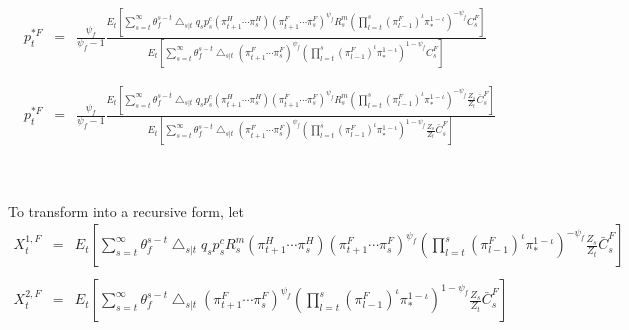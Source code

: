 \documentclass[11pt, a4paper]{article}
\begin{document}
\begin{eqnarray*}
 {p_{t}^{*F}} &=& \frac{\psi_f}{\psi_f-1} \frac{ E_t \left[  \sum_{s=t}^{\infty}  \theta_f^{s-t}  \bigtriangleup_{s|t} q_s {p_s^c} (\pi_{t+1}^H \cdots \pi_{s}^H ) (\pi_{t+1}^F \cdots \pi_s^F)^{\psi_f} R_s^m \left(  {\prod_{l=t}^s {(\pi_{l-1}^F)}^\iota \pi_*^{1-\iota} } \right)^{-\psi_f} C_s^F\right]} {  E_t \left[  \sum_{s=t}^{\infty}  \theta_f^{s-t}  \bigtriangleup_{s|t} (\pi_{t+1}^F \cdots \pi_s^F)^{\psi_f} \left(  {\prod_{l=t}^s {(\pi_{l-1}^F)}^\iota \pi_*^{1-\iota} } \right)^{1-\psi_f} C_s^F \right]} 
  \\~\\~\\ 
 {p_{t}^{*F}} &=& \frac{\psi_f}{\psi_f-1} \frac{ E_t \left[  \sum_{s=t}^{\infty}  \theta_f^{s-t}  \bigtriangleup_{s|t} q_s {p_s^c} (\pi_{t+1}^H \cdots \pi_{s}^H ) (\pi_{t+1}^F \cdots \pi_s^F)^{\psi_f} R_s^m \left(  {\prod_{l=t}^s {(\pi_{l-1}^F)}^\iota \pi_*^{1-\iota} } \right)^{-\psi_f} \frac{Z_s}{Z_t}\bar{C}_s^F\right]} {  E_t \left[  \sum_{s=t}^{\infty}  \theta_f^{s-t}  \bigtriangleup_{s|t} (\pi_{t+1}^F \cdots \pi_s^F)^{\psi_f} \left(  {\prod_{l=t}^s {(\pi_{l-1}^F)}^\iota \pi_*^{1-\iota} } \right)^{1-\psi_f} \frac{Z_s}{Z_t}\bar{C}_s^F \right]}
\end{eqnarray*}
\\~

\normalsize

 To transform into a recursive form, let  
 \begin{eqnarray*} X_t^{1,F}&=& E_t \left[  \sum_{s=t}^{\infty}  \theta_f^{s-t}  \bigtriangleup_{s|t} q_s {p_s^c}  R_s^m(\pi_{t+1}^H \cdots \pi_{s}^H ) (\pi_{t+1}^F \cdots \pi_s^F)^{\psi_f} \left(  {\prod_{l=t}^s {(\pi_{l-1}^F)}^\iota \pi_*^{1-\iota} } \right)^{-\psi_f} \frac{Z_s}{Z_t}\bar{C}_s^F\right]\\~\\ 
 X_t^{2,F}&=&E_t \left[  \sum_{s=t}^{\infty}  \theta_f^{s-t}  \bigtriangleup_{s|t} (\pi_{t+1}^F \cdots \pi_s^F)^{\psi_f} \left(  {\prod_{l=t}^s {(\pi_{l-1}^F)}^\iota \pi_*^{1-\iota} } \right)^{1-\psi_f} \frac{Z_s}{Z_t}\bar{C}_s^F \right]
 \end{eqnarray*} 
 
\end{document}
